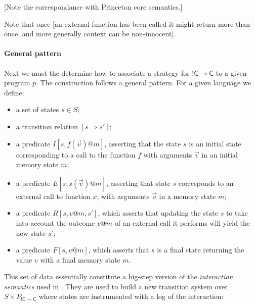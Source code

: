 \documentclass[sigplan,10pt,review,anonymous]{acmart}
\makeatletter
\newcommand{\kw}[1]{\ensuremath{ \textsf{#1} }}
\newcommand{\EC}{\kw{C}}
\newcommand{\mcall}[3]{\kw{#1}({#2})@{#3}}
\newcommand{\pcall}[3]{%
  \underline{\mcall{#1}{#2}{#3}}%
}
\newcommand{\mret}[2]{{#1}@{#2}}
\newcommand{\pret}[2]{%
  \underline{\mret{#1}{#2}}%
}
\makeatother
\begin{document}
[Note the correspondance with Princeton core semantics.]

Note that once [an external function has been called
it might return more than once,
and more generally context can be non-innocent].


\paragraph{General pattern} %

Next we must the determine how to associate a strategy for $!\EC \multimap \EC$
to a given program $p$.
The construction follows a general pattern.
For a given language we define:
\begin{itemize}
  \item a set of states $s \in S$;
  \item a transition relation $[s \Rightarrow s']$;
  \item a predicate $I[s, f(\vec{v})@m]$,
    asserting that the state $s$ is an initial state
    corresponding to a call to the function $f$
    with arguments $\vec{v}$
    in an initial memory state $m$;
  \item a predicate $E[s, \pcall{x}{\vec{v}}{m}]$,
    asserting that state $s$
    corresponds to an external call to function $x$,
    with arguments $\vec{v}$
    in a memory state $m$;
  \item a predicate $R[s, \mret{v}{m}, s']$,
    which asserts that updating the state $s$
    to take into account the outcome $v@m$
    of an external call it performs
    will yield the new state $s'$;
  \item a predicate $F[s, \pret{v}{m}]$,
    which asserts that $s$
    is a final state
    returning the value $v$
    with a final memory state $m$.
\end{itemize}
This set of data
essentially constitute a big-step version of
the \emph{interaction semantics} used in \citep{compcompcert}.
They are used to build a new transition system
over $S \times P_{!\EC \multimap \EC}$
where states are instrumented with a log of the interaction:
\end{document}
